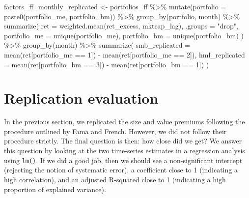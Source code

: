 \documentclass[
]{krantz}
\newenvironment{Shaded}{\begin{snugshade}}{\end{snugshade}}
\newcommand{\AttributeTok}[1]{\textcolor[rgb]{0.61,0.61,0.61}{#1}}
\newcommand{\DecValTok}[1]{\textcolor[rgb]{0.06,0.06,0.06}{#1}}
\newcommand{\FunctionTok}[1]{\textcolor[rgb]{0,0,0}{#1}}
\newcommand{\NormalTok}[1]{#1}
\newcommand{\OtherTok}[1]{\textcolor[rgb]{0.37,0.37,0.37}{#1}}
\newcommand{\SpecialCharTok}[1]{\textcolor[rgb]{0,0,0}{#1}}
\newcommand{\StringTok}[1]{\textcolor[rgb]{0.5,0.5,0.5}{#1}}
\begin{document}
\begin{Shaded}
\begin{Highlighting}[]
\NormalTok{factors\_ff\_monthly\_replicated }\OtherTok{\textless{}{-}}\NormalTok{ portfolios\_ff }\SpecialCharTok{\%\textgreater{}\%}
  \FunctionTok{mutate}\NormalTok{(}\AttributeTok{portfolio =} \FunctionTok{paste0}\NormalTok{(portfolio\_me, portfolio\_bm)) }\SpecialCharTok{\%\textgreater{}\%}
  \FunctionTok{group\_by}\NormalTok{(portfolio, month) }\SpecialCharTok{\%\textgreater{}\%}
  \FunctionTok{summarize}\NormalTok{(}
    \AttributeTok{ret =} \FunctionTok{weighted.mean}\NormalTok{(ret\_excess, mktcap\_lag), }\AttributeTok{.groups =} \StringTok{"drop"}\NormalTok{,}
    \AttributeTok{portfolio\_me =} \FunctionTok{unique}\NormalTok{(portfolio\_me),}
    \AttributeTok{portfolio\_bm =} \FunctionTok{unique}\NormalTok{(portfolio\_bm)}
\NormalTok{  ) }\SpecialCharTok{\%\textgreater{}\%}
  \FunctionTok{group\_by}\NormalTok{(month) }\SpecialCharTok{\%\textgreater{}\%}
  \FunctionTok{summarize}\NormalTok{(}
    \AttributeTok{smb\_replicated =} \FunctionTok{mean}\NormalTok{(ret[portfolio\_me }\SpecialCharTok{==} \DecValTok{1}\NormalTok{]) }\SpecialCharTok{{-}} \FunctionTok{mean}\NormalTok{(ret[portfolio\_me }\SpecialCharTok{==} \DecValTok{2}\NormalTok{]),}
    \AttributeTok{hml\_replicated =} \FunctionTok{mean}\NormalTok{(ret[portfolio\_bm }\SpecialCharTok{==} \DecValTok{3}\NormalTok{]) }\SpecialCharTok{{-}} \FunctionTok{mean}\NormalTok{(ret[portfolio\_bm }\SpecialCharTok{==} \DecValTok{1}\NormalTok{])}
\NormalTok{  )}
\end{Highlighting}
\end{Shaded}

\hypertarget{replication-evaluation}{%
\section{Replication evaluation}\label{replication-evaluation}}

In the previous section, we replicated the size and value premiums following the procedure outlined by Fama and French. However, we did not follow their procedure strictly. The final question is then: how close did we get? We answer this question by looking at the two time-series estimates in a regression analysis using \texttt{lm()}. If we did a good job, then we should see a non-significant intercept (rejecting the notion of systematic error), a coefficient close to 1 (indicating a high correlation), and an adjusted R-squared close to 1 (indicating a high proportion of explained variance).
\end{document}
